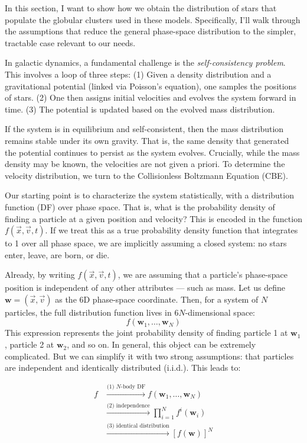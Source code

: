         In this section, I want to show how we obtain the distribution of stars that populate the globular clusters used in these models. Specifically, I'll walk through the assumptions that reduce the general phase-space distribution to the simpler, tractable case relevant to our needs.

        In galactic dynamics, a fundamental challenge is the \textit{self-consistency problem}. This involves a loop of three steps:  
        (1) Given a density distribution and a gravitational potential (linked via Poisson's equation), one samples the positions of stars.  
        (2) One then assigns initial velocities and evolves the system forward in time.  
        (3) The potential is updated based on the evolved mass distribution.  

        If the system is in equilibrium and self-consistent, then the mass distribution remains stable under its own gravity. That is, the same density that generated the potential continues to persist as the system evolves. Crucially, while the mass density may be known, the velocities are not given a priori. To determine the velocity distribution, we turn to the Collisionless Boltzmann Equation (CBE).

        Our starting point is to characterize the system statistically, with a distribution function (DF) over phase space. That is, what is the probability density of finding a particle at a given position and velocity? This is encoded in the function \( f(\vec{x}, \vec{v}, t) \). If we treat this as a true probability density function that integrates to 1 over all phase space, we are implicitly assuming a closed system: no stars enter, leave, are born, or die.

        Already, by writing \( f(\vec{x}, \vec{v}, t) \), we are assuming that a particle's phase-space position is independent of any other attributes — such as mass. Let us define \( \mathbf{w} = (\vec{x}, \vec{v}) \) as the 6D phase-space coordinate. Then, for a system of \( N \) particles, the full distribution function lives in \(6N\)-dimensional space:  
        \[
        f(\mathbf{w}_1, \dots, \mathbf{w}_N)
        \]  
        This expression represents the joint probability density of finding particle 1 at \( \mathbf{w}_1 \), particle 2 at \( \mathbf{w}_2 \), and so on. In general, this object can be extremely complicated. But we can simplify it with two strong assumptions: that particles are independent and identically distributed (i.i.d.). This leads to:

        \[
        \begin{array}{rl}
        f 
        & \stackrel{\text{(1) $N$-body DF}}{\longrightarrow} 
        f(\mathbf{w}_1, \dots, \mathbf{w}_N) \\[2ex]
        & \stackrel{\text{(2) independence}}{\longrightarrow} 
        \prod_{i=1}^N f^i(\mathbf{w}_i) \\[2ex]
        & \stackrel{\text{(3) identical distribution}}{\longrightarrow} 
        \left[ f(\mathbf{w}) \right]^N
        \end{array}
        \]

